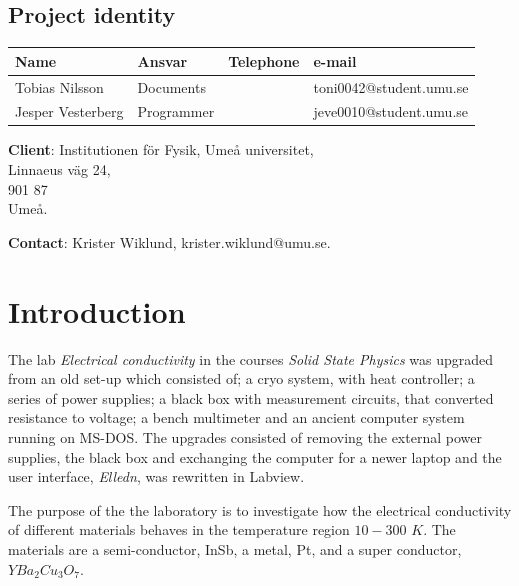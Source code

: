 \documentclass[a4paper,12pt]{article}
\begin{document}
\pagestyle{fancy}
\headheight 35pt 
\rhead{\small\today \\ }
\chead{\projektnamn}
\lhead{\organisation \\ }
\cfoot{\thepage}
\rfoot{\projektgrupp}
\begin{center}

\section*{\center Project identity}

\bigskip
\begin{tabular}{|p{35mm}|p{30mm}|p{20mm}|p{45mm}|}
\hline
\textbf{Name} & \textbf{Ansvar} & \textbf{Telephone} & \textbf{e-mail}\\
\hline
Tobias Nilsson & Documents &  & toni0042@student.umu.se\\
\hline
Jesper Vesterberg & Programmer &  & jeve0010@student.umu.se\\
\hline
\end{tabular}

\bigskip
\textbf{Client}: Institutionen för Fysik, Umeå universitet, \\
Linnaeus väg 24,\\
901 87\\
Umeå.

\textbf{Contact}: Krister Wiklund, krister.wiklund@umu.se.
\end{center}
\newpage

\tableofcontents
\newpage
{}

\section{Introduction}
The lab \emph{Electrical conductivity} in the courses \emph{Solid State Physics} was upgraded from an old set-up which consisted of; a cryo system, with heat controller; a series of power supplies; a black box with measurement circuits, that converted resistance to voltage; a bench multimeter and an ancient  computer system running on MS-DOS. The upgrades consisted of removing the external power supplies, the black box and exchanging the computer for a newer laptop and the user interface, \emph{Elledn}, was rewritten in Labview.

The purpose of the the laboratory is to investigate how the electrical conductivity of different materials behaves in the temperature region $10-300$ $K$. The materials are a semi-conductor, InSb, a metal, Pt, and a super conductor, $YBa_2Cu_3O_7$.
\end{document}
